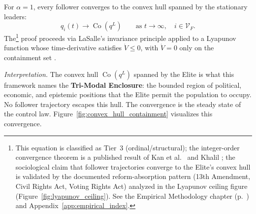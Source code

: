 \begin{theorem}\label{thm:integer-convergence}
For $\alpha = 1$, every follower converges to the convex hull spanned by the stationary leaders:
\begin{equation}\label{eq:8.10-convex-hull-convergence}
q_i(t) \longrightarrow \operatorname{Co}(q^L) \qquad \text{as } t \to \infty, \quad i \in \mathcal{V}_F.
\end{equation}
The\footnote{This equation is classified as Tier~3 (ordinal/structural); the integer-order convergence theorem is a published result of Kan et al.\ \cite{kan_containment} and Khalil \cite{khalil_nonlinear}; the sociological claim that follower trajectories converge to the Elite's convex hull is validated by the documented reform-absorption pattern (13th Amendment, Civil Rights Act, Voting Rights Act) analyzed in the Lyapunov ceiling figure (Figure~\ref{fig:lyapunov_ceiling}). See the Empirical Methodology chapter (p.~\pageref{ch:empirical_methodology}) and Appendix~\ref{app:empirical_index}.} proof proceeds via LaSalle's invariance principle applied to a Lyapunov function whose time-derivative satisfies $\dot V \leq 0$, with $\dot V = 0$ only on the containment set \cite{khalil_nonlinear, kan_containment}.
\end{theorem}

\noindent \textit{Interpretation.} The convex hull $\operatorname{Co}(q^L)$ spanned by the Elite is what this framework names the \textbf{Tri-Modal Enclosure}: the bounded region of political, economic, and epistemic positions that the Elite permit the population to occupy. No follower trajectory escapes this hull. The convergence is the steady state of the control law. Figure~\ref{fig:convex_hull_containment} visualizes this convergence.

